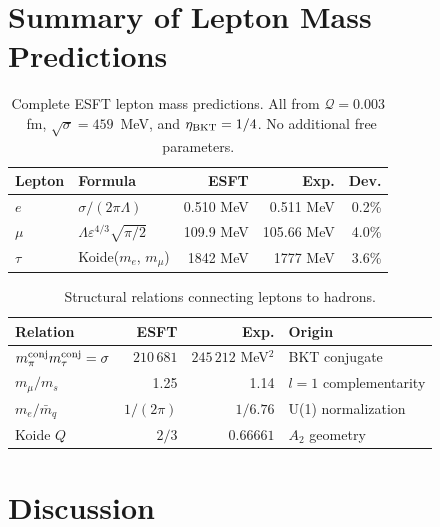 ﻿\documentclass[twocolumn,preprintnumbers,amsmath,amssymb]{revtex4-2}
\newcommand{\Qoppa}{\mathcal{Q}}
\begin{document}
\section{Summary of Lepton Mass Predictions}
\label{sec:summary}

\begin{table}[h]
\caption{Complete ESFT lepton mass predictions. All from $\Qoppa = 0.003$~fm, $\sqrt{\sigma} = 459$~MeV, and $\eta_{\rm BKT} = 1/4$. No additional free parameters.}
\label{tab:leptons}
\begin{ruledtabular}
\begin{tabular}{llrrr}
Lepton & Formula & ESFT & Exp. & Dev. \\
\hline
$e$ & $\sigma/(2\pi\Lambda)$ & 0.510 MeV & 0.511 MeV & 0.2\% \\
$\mu$ & $\Lambda\varepsilon^{4/3}\sqrt{\pi/2}$ & 109.9 MeV & 105.66 MeV & 4.0\% \\
$\tau$ & Koide($m_e$, $m_\mu$) & 1842 MeV & 1777 MeV & 3.6\% \\
\end{tabular}
\end{ruledtabular}
\end{table}

\begin{table}[h]
\caption{Structural relations connecting leptons to hadrons.}
\label{tab:relations}
\begin{ruledtabular}
\begin{tabular}{lrrl}
Relation & ESFT & Exp. & Origin \\
\hline
$m_\pi^{\rm conj} m_\tau^{\rm conj} = \sigma$ & $210\,681$ & $245\,212$ MeV$^2$ & BKT conjugate \\
$m_\mu / m_s$ & 1.25 & 1.14 & $l = 1$ complementarity \\
$m_e / \bar{m}_q$ & $1/(2\pi)$ & $1/6.76$ & U(1) normalization \\
Koide $Q$ & $2/3$ & $0.66661$ & $A_2$ geometry \\
\end{tabular}
\end{ruledtabular}
\end{table}

\section{Discussion}
\label{sec:discussion}
\end{document}
